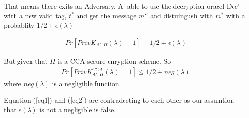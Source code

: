 


That means there exits an Adversary, A' able to use the decryption oracel Dec'
with a new valid tag, $t^*$ and get the message $m''$ and distuingush with  $m^*$ with a probablity $ 1/2 + \epsilon(\lambda)$


\begin{align}
     Pr[ PrivK_{A',\Pi}(\lambda) = 1 ] = 1/2 + \epsilon(\lambda)
    \label{eq1}
\end{align}




But given that $\Pi$ is a CCA secure enryption scheme. So
\begin{align}
    Pr[ PrivK_{A',\Pi}^{CCA}(\lambda) = 1]  \leq 1/2 + neg(\lambda)
    \label{eq2}
\end{align}
where $neg(\lambda)$ is a negligible function. 


Equation (\ref*{eq1}) and (\ref*{eq2}) are contradecting to each other as our assumtion 
that $\epsilon(\lambda)$ is not a negligible is false.


